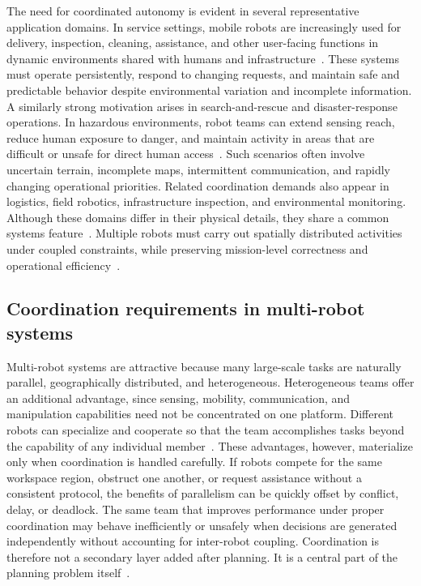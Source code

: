 The need for coordinated autonomy is evident in several representative
application domains. In service settings, mobile robots are increasingly used
for delivery, inspection, cleaning, assistance, and other user-facing functions
in dynamic environments shared with humans and infrastructure~\citep{lee2021service}.
These systems
must operate persistently, respond to changing requests, and maintain safe and
predictable behavior despite environmental variation and incomplete
information.
A similarly strong motivation arises in search-and-rescue and disaster-response
operations. In hazardous environments, robot teams can extend sensing reach,
reduce human exposure to danger, and maintain activity in areas that are
difficult or unsafe for direct human access~\citep{murphy2014disaster}. Such scenarios often involve
uncertain terrain, incomplete maps, intermittent communication, and rapidly
changing operational priorities. 
Related coordination demands also appear in logistics, field robotics,
infrastructure inspection, and environmental monitoring. Although these domains
differ in their physical details, they share a common systems feature~\citep{parker2008multiple}.
Multiple robots must carry out spatially distributed activities under coupled
constraints, while preserving mission-level correctness and operational
efficiency~\citep{torreno2017cooperative}.

\subsection{Coordination requirements in multi-robot systems}
\label{sec:ch01:background:requirements}


Multi-robot systems are attractive because many large-scale tasks are naturally
parallel, geographically distributed, and heterogeneous.  Heterogeneous teams offer
an additional advantage, since sensing, mobility, communication, and
manipulation capabilities need not be concentrated on one platform. Different
robots can specialize and cooperate so that the team accomplishes tasks beyond
the capability of any individual member~\citep{fioretto2018distributed}.
These advantages, however, materialize only when coordination is handled
carefully. If robots compete for the same workspace region, obstruct one
another, or request assistance without a consistent protocol, the benefits of
parallelism can be quickly offset by conflict, delay, or deadlock. The same
team that improves performance under proper coordination may behave
inefficiently or unsafely when decisions are generated independently without
accounting for inter-robot coupling. Coordination is therefore not a secondary
layer added after planning. It is a central part of the planning problem
itself~\citep{parker2008multiple,torreno2017cooperative}.


